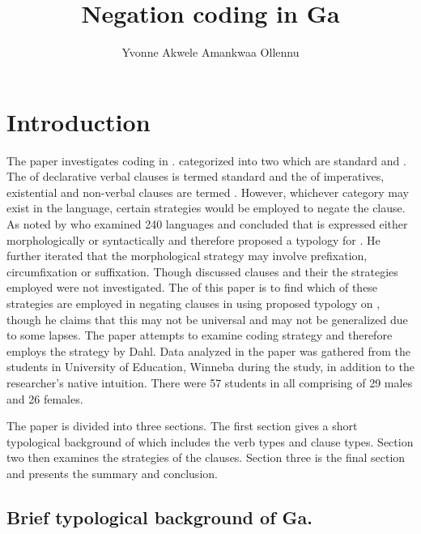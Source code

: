 \documentclass[output=paper
,newtxmath
,modfonts
,nonflat]{langsci/langscibook}
\author{Yvonne Akwele Amankwaa Ollennu\affiliation{University of Education Winneba}}
\title{Negation coding in Ga}
\begin{document}
\maketitle


\section{\label{sec:ollennu:1} Introduction}

The paper investigates  coding in . \citet[553]{Miestamo2007} categorized  into two which are standard and . The  of declarative verbal clauses is termed standard  and the  of imperatives, existential and non-verbal clauses are termed . However, whichever category may exist in the language, certain strategies would be employed to negate the clause. As noted by \citet{dahl1979typology} who examined 240 languages and concluded that  is expressed either morphologically or syntactically and therefore proposed a typology for . He further iterated that the morphological strategy may involve prefixation, circumfixation or suffixation. Though \citet{Dakubu2003} discussed  clauses and their  the strategies employed were not investigated. The  of this paper is to find which of these strategies are employed in negating clauses in  using  proposed typology on , though he claims that this may not be universal and may not be generalized due to some lapses. The paper attempts to examine  coding strategy and therefore employs the strategy by Dahl. Data analyzed in the paper was gathered from the  students in University of Education, Winneba during the study, in addition to the researcher’s native intuition. There were 57 students in all comprising of 29 males and 26 females.


The paper is divided into three sections. The first section gives a short typological background of  which includes the verb types and clause types. Section two then examines the  strategies of the  clauses. Section three is the final section and presents the summary and conclusion.

\subsection{\label{sec:ollennu:1.1} Brief typological background of Ga.}
\end{document}
